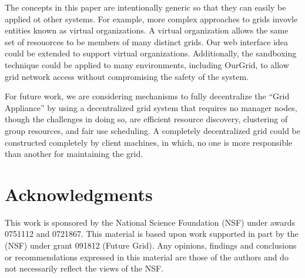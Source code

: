 \documentclass[conference]{IEEEtran}
\begin{document}
The concepts in this paper are intentionally generic so that they can easily be
applied ot other systems.  For example, more complex approaches to grids
invovle entities known as virtual organizations.  A virtual organization allows
the same set of resouorces to be members of many distinct grids.  Our web
interface idea could be extended to support virtual organizations.
Additionally, the sandboxing technique could be applied to many environments,
including OurGrid, to allow grid network access without compromising the safety
of the system.

For future work, we are considering mechanisms to fully decentralize the ``Grid
Appliance'' by using a decentralized grid system that requires no manager
nodes, though the challenges in doing so, are efficient resource discovery,
clustering of group resources, and fair use scheduling.  A completely
decentralized grid could be constructed completely by client machines, in
which, no one is more responsible than another for maintaining the grid.

\section*{Acknowledgments}

This work is sponsored by the National Science Foundation (NSF) under awards
0751112 and 0721867.  This material is based upon work supported in part by the
(NSF) under grant 091812 (Future Grid).  Any opinions, findings and conclusions
or recommendations expressed in this material are those of the authors and do
not necessarily reflect the views of the NSF.



\end{document}
